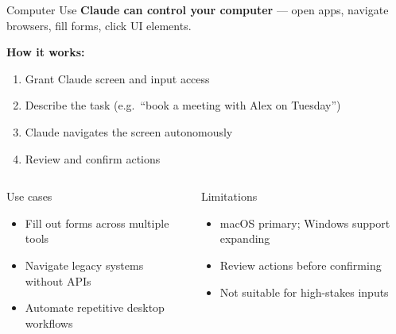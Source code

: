 \documentclass[aspectratio=169]{beamer}
\begin{document}
\begin{frame}{Computer Use}
\textbf{Claude can control your computer} --- open apps, navigate browsers, fill forms, click UI elements.

\bigskip
\textbf{How it works:}
\begin{enumerate}
  \item Grant Claude screen and input access
  \item Describe the task (e.g.\ ``book a meeting with Alex on Tuesday'')
  \item Claude navigates the screen autonomously
  \item Review and confirm actions
\end{enumerate}

\bigskip
\begin{columns}[T]
\begin{exampleblock}{Use cases}
\begin{itemize}
  \item Fill out forms across multiple tools
  \item Navigate legacy systems without APIs
  \item Automate repetitive desktop workflows
\end{itemize}
\end{exampleblock}

\begin{alertblock}{Limitations}
\begin{itemize}
  \item macOS primary; Windows support expanding
  \item Review actions before confirming
  \item Not suitable for high-stakes inputs
\end{itemize}
\end{alertblock}
\end{columns}
\end{frame}
\end{document}
